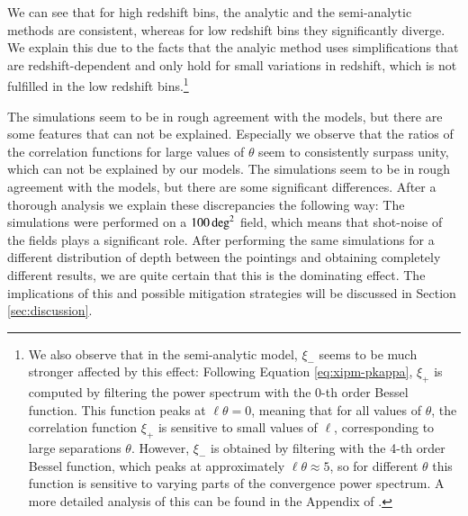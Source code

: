 We can see that for high redshift bins, the analytic and the semi-analytic methods are consistent, whereas for low redshift bins they significantly diverge. We explain this due to the facts that the analyic method uses simplifications that are redshift-dependent and only hold for small variations in redshift, which is not fulfilled in the low redshift bins.\footnote{We also observe that in the semi-analytic model, $\xi_-$ seems to be much stronger affected by this effect: Following Equation \eqref{eq:xipm-pkappa}, $\xi_+$ is computed by filtering the power spectrum with the 0-th order Bessel function. This function peaks at $\ell\theta=0$, meaning that for all values of $\theta$, the correlation function $\xi_+$ is sensitive to small values of $\ell$, corresponding to large separations $\theta$. However, $\xi_-$ is obtained by filtering with the 4-th order Bessel function, which peaks at approximately $\ell\theta\approx 5$, so for different $\theta$ this function is sensitive to varying parts of the convergence power spectrum. A more detailed analysis of this can be found in the Appendix of \citet{2017MNRAS.471.4412K}.}

The simulations seem to be in rough agreement with the models, but there are some features that can not be explained. Especially we observe that the ratios of the correlation functions for large values of $\theta$ seem to consistently surpass unity, which can not be explained by our models. The simulations seem to be in rough agreement with the models, but there are some significant differences. After a thorough analysis we explain these discrepancies the following way: The simulations were performed on a $100\,\rm{deg}^2$ field, which means that shot-noise of the fields plays a significant role. After performing the same simulations for a different distribution of depth between the pointings and obtaining completely different results, we are quite certain that this is the dominating effect. The implications of this and possible mitigation strategies will be discussed in Section \ref{sec:discussion}.


